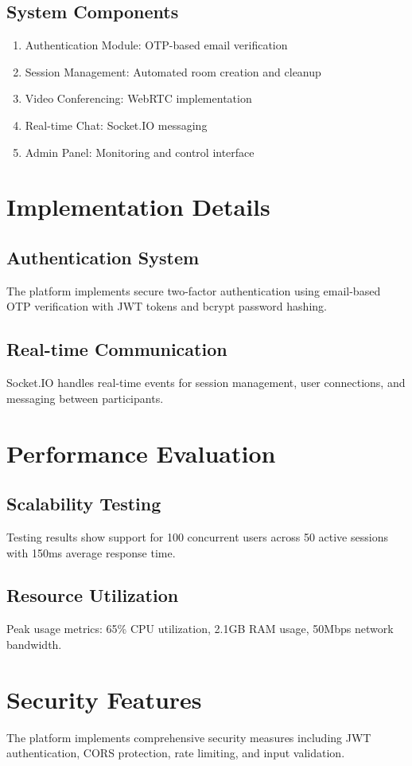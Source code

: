 \documentclass[journal]{IEEEtran}
\begin{document}
\subsection{System Components}
\begin{enumerate}
\item Authentication Module: OTP-based email verification
\item Session Management: Automated room creation and cleanup
\item Video Conferencing: WebRTC implementation
\item Real-time Chat: Socket.IO messaging
\item Admin Panel: Monitoring and control interface
\end{enumerate}

\section{Implementation Details}
\subsection{Authentication System}
The platform implements secure two-factor authentication using email-based OTP verification with JWT tokens and bcrypt password hashing.

\subsection{Real-time Communication}
Socket.IO handles real-time events for session management, user connections, and messaging between participants.

\section{Performance Evaluation}
\subsection{Scalability Testing}
Testing results show support for 100 concurrent users across 50 active sessions with 150ms average response time.

\subsection{Resource Utilization}
Peak usage metrics: 65\% CPU utilization, 2.1GB RAM usage, 50Mbps network bandwidth.

\section{Security Features}
The platform implements comprehensive security measures including JWT authentication, CORS protection, rate limiting, and input validation.
\end{document}
